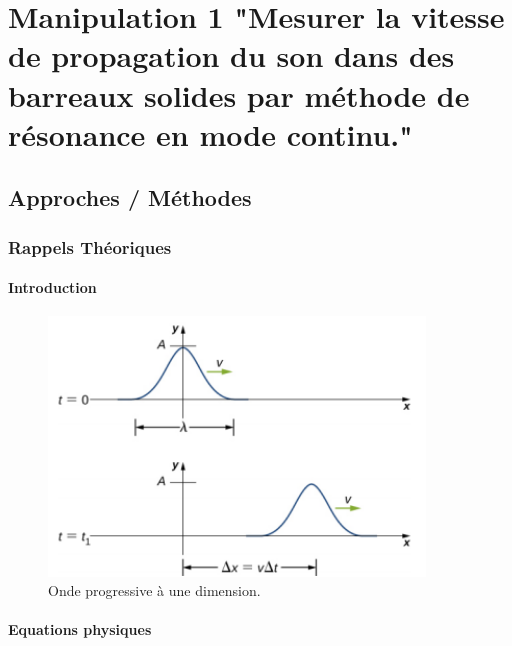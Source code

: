 \section{Manipulation 1 "Mesurer la vitesse de propagation du son dans des
barreaux solides par méthode de résonance en mode continu."}
\subsection{\large Approches / Méthodes}
\subsubsection{\large Rappels Théoriques}

\paragraph{Introduction}

\begin{figure}[h]
    \centering
    \includegraphics[width=10cm]{png/onde.png}
    \caption{Onde progressive à une dimension.~\cite{image-onde-progressive}}
\end{figure}

\paragraph{Equations physiques}

